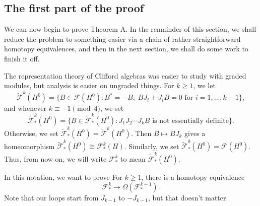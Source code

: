 \documentclass{shortart}
\theoremstyle{definition}
\newenvironment{customthm}[1]
  {\renewcommand\theinnercustomthm{#1}\innercustomthm}
  {\endinnercustomthm}
\begin{document}
\subsection{The first part of the proof}
We can now begin to prove Theorem A. In the remainder of this section, we shall reduce the problem to something easier via a chain of rather straightforward homotopy equivalences, and then in the next section, we shall do some work to finish it off.

The representation theory of Clifford algebras was easier to study with graded modules, but analysis is easier on ungraded things. For $k \geq 1$, we let
\[
  \tilde{\mathcal{F}}^k(H^0) = \{B \in \mathcal{F}(H^0): B^* = -B,\; B J_i + J_i B = 0\text{ for }i = 1, \ldots, k - 1\},
\]
and whenever $k \equiv -1\pmod 4$, we set
\[
  \tilde{\mathcal{F}}^k_*(H^0) = \{B \in \tilde{\mathcal{F}}^k_*(H^0): J_1 J_2 \cdots J_kB \text{ is not essentially definite}\}.
\]
Otherwise, we set $\tilde{\mathcal{F}}^k_*(H^0) = \tilde{\mathcal{F}}^k(H^0)$. Then $B \mapsto BJ_k$ gives a homeomorphism $\tilde{\mathcal{F}}^k_*(H^0) \cong \mathcal{F}^k_*(H)$. Similarly, we set $\tilde{\mathcal{F}}^0_*(H^0) = \mathcal{F}(H^0)$. Thus, from now on, we will write $\mathcal{F}^k_*$ to mean $\tilde{\mathcal{F}}^k_*(H^0)$.

In this notation, we want to prove
\begin{customthm}{A'}
  For $k \geq 1$, there is a homotopy equivalence
  \[
    \mathcal{F}^k_* \to \Omega(\mathcal{F}^{k - 1}_*).
  \]
\end{customthm}
Note that our loops start from $J_{k - 1}$ to $-J_{k - 1}$, but that doesn't matter.
%
%
\end{document}
